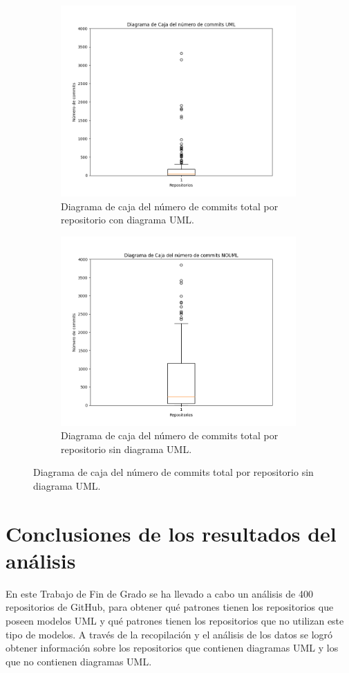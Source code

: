 \documentclass[a4paper, 12pt]{book}
\begin{document}
\begin{figure}
  \centering
  \begin{subfigure}{0.45\linewidth}
    \centering
    \includegraphics[width=9cm, keepaspectratio]{img/Figure_commitsUML.png}
    \caption{Diagrama de caja del número de commits total por repositorio con diagrama UML. }\label{fig:Figure_commitsUML}
  \end{subfigure}
  \hfill
    \begin{subfigure}{0.45\linewidth}
      \centering
      \includegraphics[width=9cm, keepaspectratio]{img/Figure_commitsNOUML.png}
      \caption{Diagrama de caja del número de commits total por repositorio sin diagrama UML.}\label{fig:Figure_commitsNOUML}
  \end{subfigure}
\end{figure}

\section{Conclusiones de los resultados del análisis}
\label{sec:conclusiones de los resultados del análisis}

En este Trabajo de Fin de Grado se ha llevado a cabo un análisis de 400 repositorios de GitHub, para obtener qué patrones tienen los repositorios que poseen modelos UML y qué patrones tienen los repositorios que no utilizan este tipo de modelos.
A través de la recopilación y el análisis de los datos se logró obtener información sobre los repositorios que contienen diagramas UML y los que no contienen diagramas UML.
\end{document}
